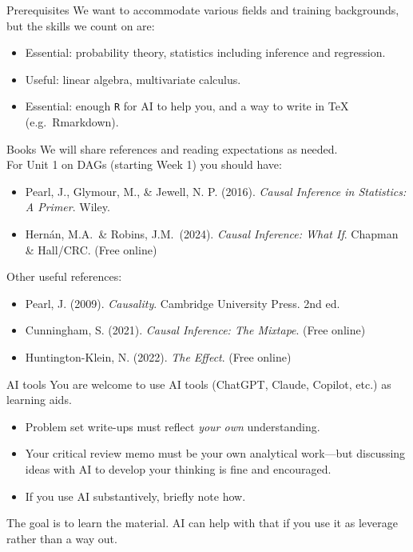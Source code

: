 \documentclass[xcolor=dvipsnames]{beamer}
\begin{document}
\begin{frame}{Prerequisites}
We want to accommodate various fields and training backgrounds, but the skills we count on are:
\medskip
\small
\begin{itemize}
\item Essential: probability theory, statistics including inference and regression.
\item Useful: linear algebra, multivariate calculus.
\item Essential: enough \texttt{R} for AI to help you, and a way to write in \TeX{} (e.g.\ Rmarkdown).
\end{itemize}
\end{frame}

\begin{frame}{Books}
\small
{} We will share references and reading expectations as needed.  \\
\bigskip
{} For Unit 1 on DAGs (starting Week 1) you should have:
\begin{itemize}
\item Pearl, J., Glymour, M., \& Jewell, N. P. (2016). \textit{Causal Inference in Statistics: A Primer}. Wiley.
\item Hern\'an, M.A.\ \& Robins, J.M.\ (2024). \textit{Causal Inference: What If}. Chapman \& Hall/CRC. (Free online)
\end{itemize}
\bigskip
{} Other useful references:
\begin{itemize}
\item Pearl, J. (2009). \textit{Causality}. Cambridge University Press. 2nd ed.
\item Cunningham, S. (2021). \textit{Causal Inference: The Mixtape}. (Free online)
\item Huntington-Klein, N. (2022). \textit{The Effect}. (Free online)
\end{itemize}
\end{frame}

\begin{frame}{AI tools}
\small
You are welcome to use AI tools (ChatGPT, Claude, Copilot, etc.) as learning aids.\\
\medskip
\begin{itemize}
\item Problem set write-ups must reflect \textit{your own} understanding.
\item Your critical review memo must be your own analytical work---but discussing ideas with AI to develop your thinking is fine and encouraged.
\item If you use AI substantively, briefly note how.
\end{itemize}
\medskip
The goal is to learn the material. AI can help with that if you use it as leverage rather than a way out.
\end{frame}
\end{document}
